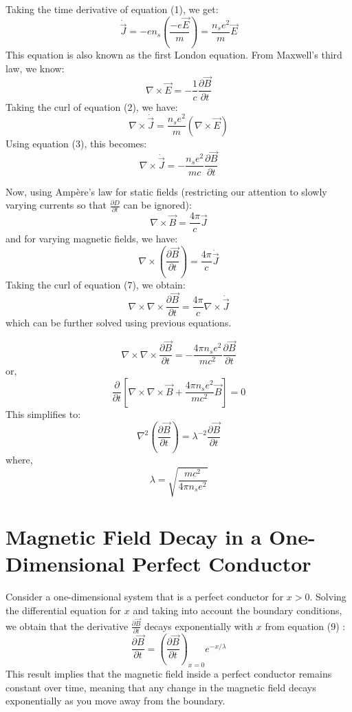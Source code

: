 \documentclass{article}
\begin{document}
Taking the time derivative of equation (1), we get:
\[
\dot{\vec{J}} = -en_s \left( \frac{-e \vec{E}}{m} \right) = \frac{n_s e^2}{m} \vec{E} \tag{2}
\]
This equation is also known as the first London equation. From Maxwell's third law, we know:
\[
\nabla \times \vec{E} = - \frac{1}{c} \frac{\partial \vec{B}}{\partial t} \tag{3}
\]
Taking the curl of equation (2), we have:
\[
\nabla \times \dot{\vec{J}} = \frac{n_s e^2}{m} (\nabla \times \vec{E}) \tag{4}
\]
Using equation (3), this becomes:
\[
\nabla \times \dot{\vec{J}} = - \frac{n_s e^2}{mc} \frac{\partial \vec{B}}{\partial t} \tag{5}
\]

Now, using Ampère's law for static fields (restricting our attention to slowly varying currents so that \(\frac{\partial D}{\partial t}\) can be ignored):
\[
\nabla \times \vec{B} = \frac{4 \pi}{c} \vec{J} \tag{6}
\]
and for varying magnetic fields, we have:
\[
\nabla \times \left( \frac{\partial \vec{B}}{\partial t} \right) = \frac{4 \pi}{c} \dot{\vec{J}} \tag{7}
\]
Taking the curl of equation (7), we obtain:
\[
    \nabla \times \nabla \times \frac{\partial \vec{B}}{\partial t} = \frac{4 \pi}{c} \nabla \times \dot{\vec{J}}
\]
which can be further solved using previous equations.

\[
\nabla \times \nabla \times \frac{\partial \vec{B}}{\partial t} = - \frac{4 \pi n_s e^2}{mc^2} \frac{\partial \vec{B}}{\partial t} \tag{8}
\]
or,
\[
\frac{\partial}{\partial t} \left[ \nabla \times \nabla \times \vec{B} + \frac{4 \pi n_s e^2}{mc^2} \vec{B} \right] = 0
\]
This simplifies to:
\[
\nabla^2 \left( \frac{\partial \vec{B}}{\partial t} \right) = \lambda^{-2} \frac{\partial \vec{B}}{\partial t} \tag{9}
\]
where,
\[
\lambda = \sqrt{\frac{mc^2}{4 \pi n_s e^2}} \tag{10}
\]

\section{Magnetic Field Decay in a One-Dimensional Perfect Conductor}

Consider a one-dimensional system that is a perfect conductor for \(x > 0\). Solving the differential equation for \(x\) and taking into account the boundary conditions, we obtain that the derivative \(\frac{\partial \vec{B}}{\partial t}\) decays exponentially with \(x\) from equation (9) :
\[
\frac{\partial \vec{B}}{\partial t} = \left( \frac{\partial \vec{B}}{\partial t} \right)_{x=0} e^{-x/\lambda} \tag{11}
\]
This result implies that the magnetic field inside a perfect conductor remains constant over time, meaning that any change in the magnetic field decays exponentially as you move away from the boundary.
\end{document}
